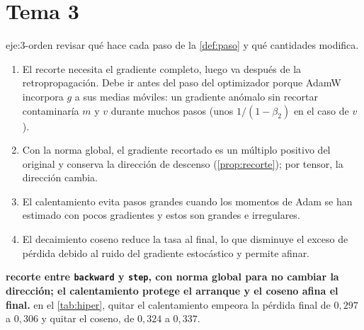 \section{Tema 3}

\begin{solucion}{eje:3-orden}
\planteamiento revisar qué hace cada paso de la \cref{def:paso} y qué cantidades modifica.
\pasos
\begin{enumerate}[label=\arabic*.]
  \item El recorte necesita el gradiente completo, luego va después de la retropropagación. Debe ir antes del paso del optimizador porque AdamW incorpora $g$ a sus medias móviles: un gradiente anómalo sin recortar contaminaría $m$ y $v$ durante muchos pasos (unos $1/(1-\beta_2)$ en el caso de $v$).
  \item Con la norma global, el gradiente recortado es un múltiplo positivo del original y conserva la dirección de descenso (\cref{prop:recorte}); por tensor, la dirección cambia.
  \item El calentamiento evita pasos grandes cuando los momentos de Adam se han estimado con pocos gradientes y estos son grandes e irregulares.
  \item El decaimiento coseno reduce la tasa al final, lo que disminuye el exceso de pérdida debido al ruido del gradiente estocástico y permite afinar.
\end{enumerate}
\resultado \textbf{recorte entre \texttt{backward} y \texttt{step}, con norma global para no cambiar la dirección; el calentamiento protege el arranque y el coseno afina el final.}
\comprobacion en el \cref{tab:hiper}, quitar el calentamiento empeora la pérdida final de $0{,}297$ a $0{,}306$ y quitar el coseno, de $0{,}324$ a $0{,}337$.
\end{solucion}

